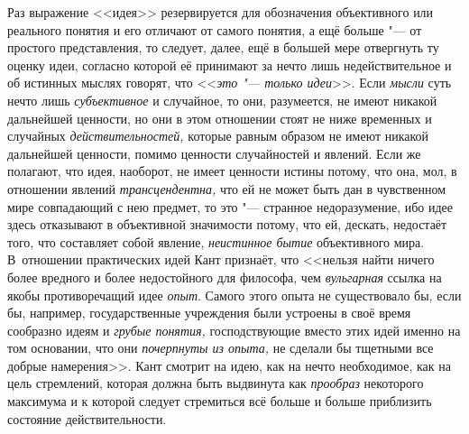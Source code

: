 Раз выражение <<идея>> резервируется для обозначения
объективного или реального понятия и его отличают от самого понятия, а ещё
больше "--- от простого представления, то следует, далее, ещё в
большей мере отвергнуть ту оценку идеи, согласно которой её принимают за
нечто лишь недействительное и об истинных мыслях говорят, что
<<{\em это "--- только
идеи}>>. Если {\em мысли}
суть нечто лишь
{\em субъективное} и
случайное, то они, разумеется, не имеют никакой дальнейшей ценности, но они
в этом отношении стоят не ниже временных и случайных
{\em действительностей,}
которые равным образом не имеют никакой дальнейшей ценности,
помимо ценности случайностей и явлений. Если же полагают, что идея,
наоборот, не имеет ценности истины потому, что она, мол, в отношении
явлений {\em трансцендентна,}
что ей не может быть дан в чувственном мире совпадающий с нею
предмет,
то это "--- странное недоразумение, ибо идее
здесь отказывают в объективной значимости потому, что ей, дескать,
недостаёт того, что составляет собой явление,
{\em неистинное бытие}
объективного мира. В~отношении практических идей Кант
признаёт, что <<нельзя найти ничего более вредного и более недостойного для
философа, чем {\em вульгарная}
ссылка на якобы противоречащий идее
{\em опыт}. Самого этого
опыта не существовало бы, если бы, например, государственные учреждения
были устроены в своё время сообразно идеям и
{\em грубые понятия,} господствующие вместо этих идей именно на том
основании, что они {\em почерпнуты из опыта,} не сделали бы тщетными
все добрые намерения>>.
Кант смотрит на идею, как на нечто необходимое, как на цель
стремлений, которая должна быть выдвинута как
{\em прообраз} некоторого
максимума и к которой следует стремиться всё больше и больше приблизить
состояние действительности.


